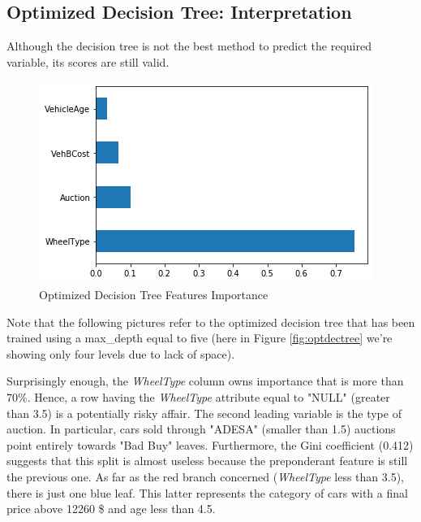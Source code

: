\documentclass{article}
\begin{document}
	\subsection{Optimized Decision Tree: Interpretation}
	Although the decision tree is not the best method to predict the required variable, its scores are still valid.
	\begin{figure}
		\centering
		\includegraphics[width=.4\textwidth]{dectreevar.png}
		\caption{Optimized Decision Tree Features Importance}
		\label{fig:optdectreefeat}
	\end{figure}
	Note that the following pictures refer to the optimized decision tree that has been trained using a max\_depth equal to five (here in Figure \ref{fig:optdectree} we're showing only four levels due to lack of space).
	
	Surprisingly enough, the \emph{WheelType} column owns importance that is more than 70\%. Hence, a row having the \emph{WheelType} attribute equal to "NULL" (greater than 3.5) is a potentially risky affair. The second leading variable is the type of auction. In particular, cars sold through "ADESA" (smaller than 1.5) auctions point entirely towards "Bad Buy" leaves. Furthermore, the Gini coefficient (0.412) suggests that this split is almost useless because the preponderant feature is still the previous one. As far as the red branch concerned (\emph{WheelType} less than 3.5), there is just one blue leaf. This latter represents the category of cars with a final price above 12260 \$ and age less than 4.5.
	
	
	
\end{document}

